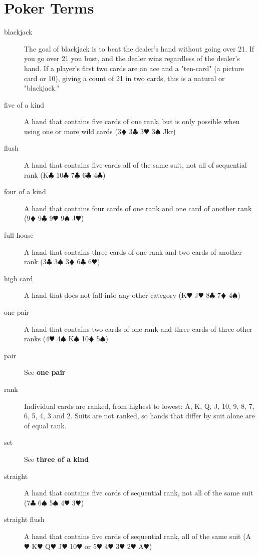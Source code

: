 \documentclass{article}
\begin{document}
\section{Poker Terms}
\begin{description}
 \item[blackjack] The goal of blackjack is to beat the dealer's hand without going over 21. If you go over 21 you bust, and the dealer wins regardless of the dealer's hand. If a player's first two cards are an ace and a "ten-card" (a picture card or 10), giving a count of 21 in two cards, this is a natural or "blackjack."
 \item[five of a kind] A hand that contains five cards of one rank, but is only possible when using one or more wild cards (3$\vardiamond$ 3$\clubsuit$ 3$\varheart$ 3$\spadesuit$ Jkr)
 \item[flush] A hand that contains five cards all of the same suit, not all of sequential rank (K$\clubsuit$ 10$\clubsuit$ 7$\clubsuit$ 6$\clubsuit$ 4$\clubsuit$)
 \item[four of a kind] A hand that contains four cards of one rank and one card of another rank (9$\vardiamond$ 9$\clubsuit$ 9$\varheart$ 9$\spadesuit$ J$\varheart$)
 \item[full house] A hand that contains three cards of one rank and two cards of another rank (3$\clubsuit$ 3$\spadesuit$ 3$\vardiamond$ 6$\clubsuit$ 6$\varheart$)
 \item[high card] A hand that does not fall into any other category (K$\varheart$ J$\varheart$ 8$\clubsuit$ 7$\vardiamond$ 4$\spadesuit$)
 \item[one pair] A hand that contains two cards of one rank and three cards of three other ranks (4$\varheart$ 4$\spadesuit$ K$\spadesuit$ 10$\vardiamond$ 5$\spadesuit$)
 \item[pair] See \textbf{one pair}
 \item[rank] Individual cards are ranked, from highest to lowest: A, K, Q, J, 10, 9, 8, 7, 6, 5, 4, 3 and 2. Suits are not ranked, so hands that differ by suit alone are of equal rank.
 \item[set] See \textbf{three of a kind}
 \item[straight] A hand that contains five cards of sequential rank, not all of the same suit (7$\clubsuit$ 6$\spadesuit$ 5$\spadesuit$ 4$\varheart$ 3$\varheart$)
 \item[straight flush] A hand that contains five cards of sequential rank, all of the same suit (A$\varheart$ K$\varheart$ Q$\varheart$ J$\varheart$ 10$\varheart$ or 5$\varheart$ 4$\varheart$ 3$\varheart$ 2$\varheart$ A$\varheart$)

\end{description}
\end{document}
